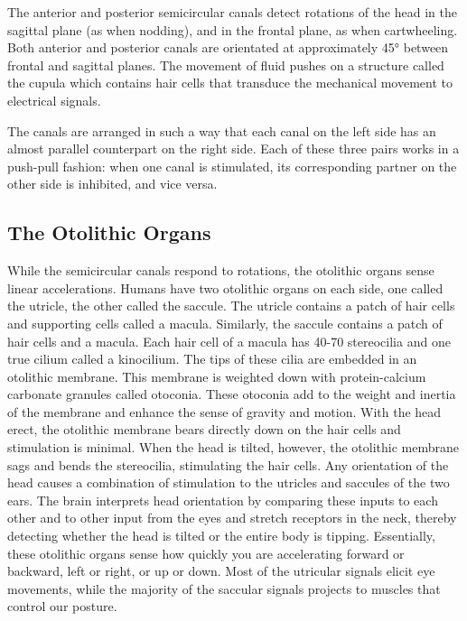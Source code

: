 The anterior and posterior semicircular canals detect rotations of the head in the sagittal plane (as when nodding), and in the frontal plane, as when cartwheeling. Both anterior and posterior canals are orientated at approximately 45° between frontal and sagittal planes.
The movement of fluid pushes on a structure called the cupula which contains hair cells that transduce the mechanical movement to electrical signals.

The canals are arranged in such a way that each canal on the left side has an almost parallel counterpart on the right side. Each of these three pairs works in a push-pull fashion: when one canal is stimulated, its corresponding partner on the other side is inhibited, and vice versa.

\hypertarget{the-otolithic-organs}{%
\subsection{The Otolithic Organs}\label{the-otolithic-organs}}

While the semicircular canals respond to rotations, the otolithic organs sense linear accelerations. Humans have two otolithic organs on each side, one called the utricle, the other called the saccule. The utricle contains a patch of hair cells and supporting cells called a macula. Similarly, the saccule contains a patch of hair cells and a macula. Each hair cell of a macula has 40-70 stereocilia and one true cilium called a kinocilium. The tips of these cilia are embedded in an otolithic membrane. This membrane is weighted down with protein-calcium carbonate granules called otoconia. These otoconia add to the weight and inertia of the membrane and enhance the sense of gravity and motion. With the head erect, the otolithic membrane bears directly down on the hair cells and stimulation is minimal. When the head is tilted, however, the otolithic membrane sags and bends the stereocilia, stimulating the hair cells. Any orientation of the head causes a combination of stimulation to the utricles and saccules of the two ears. The brain interprets head orientation by comparing these inputs to each other and to other input from the eyes and stretch receptors in the neck, thereby detecting whether the head is tilted or the entire body is tipping. Essentially, these otolithic organs sense how quickly you are accelerating forward or backward, left or right, or up or down. Most of the utricular signals elicit eye movements, while the majority of the saccular signals projects to muscles that control our posture.

